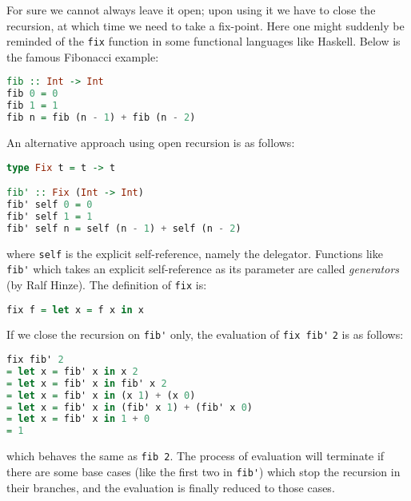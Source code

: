 For sure we cannot always leave it open; upon using it we have to close the recursion, at which time we need to take a fix-point. Here one might suddenly be reminded of the \lstinline{fix} function in some functional languages like Haskell. Below is the famous Fibonacci example:
\begin{lstlisting}[language=Haskell,keywords={}]
fib :: Int -> Int
fib 0 = 0
fib 1 = 1
fib n = fib (n - 1) + fib (n - 2)
\end{lstlisting}
An alternative approach using open recursion is as follows:
\begin{lstlisting}[language=Haskell,keywords={type}]
type Fix t = t -> t

fib' :: Fix (Int -> Int)
fib' self 0 = 0
fib' self 1 = 1
fib' self n = self (n - 1) + self (n - 2)
\end{lstlisting}
where \lstinline{self} is the explicit self-reference, namely the delegator. Functions like \lstinline{fib'} which takes
an explicit self-reference as its parameter are called \textit{generators} (by Ralf Hinze). The definition of \lstinline{fix} is:
\begin{lstlisting}[language=Haskell,keywords={}]
fix f = let x = f x in x
\end{lstlisting}
If we close the recursion on \lstinline{fib'} only, the evaluation of \lstinline{fix fib'} \lstinline{2} is as follows:
\begin{lstlisting}[language=Haskell,keywords={}]
   fix fib' 2
= let x = fib' x in x 2
= let x = fib' x in fib' x 2
= let x = fib' x in (x 1) + (x 0)
= let x = fib' x in (fib' x 1) + (fib' x 0)
= let x = fib' x in 1 + 0
= 1
\end{lstlisting}
which behaves the same as \lstinline{fib 2}. The process of evaluation will terminate if there are some base cases (like the first two in
\lstinline{fib'}) which stop the recursion in their branches, and the evaluation is finally reduced to those cases.

